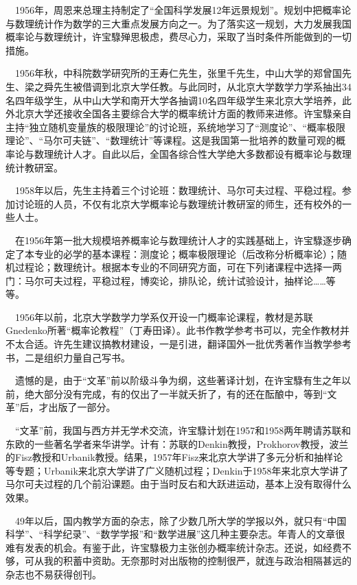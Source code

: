 $\quad$1956年，周恩来总理主持制定了“全国科学发展12年远景规划”。规划中把概率论与数理统计作为数学的三大重点发展方向之一。为了落实这一规划，大力发展我国概率论与数理统计，许宝騄殚思极虑，费尽心力，采取了当时条件所能做到的一切措施。

$\quad$1956年秋，中科院数学研究所的王寿仁先生，张里千先生，中山大学的郑曾国先生、梁之舜先生被借调到北京大学任教。与此同时，从北京大学数学力学系抽出34名四年级学生，从中山大学和南开大学各抽调10名四年级学生来北京大学培养，此外北京大学还接收全国各主要综合大学的概率统计方面的教师来进修。许宝騄亲自主持“独立随机变量族的极限理论”的讨论班，系统地学习了“测度论”、“概率极限理论”、“马尔可夫链”、“数理统计”等课程。这是我国第一批培养的数量可观的概率论与数理统计人才。自此以后，全国各综合性大学绝大多数都设有概率论与数理统计教研室。

$\quad$1958年以后，先生主持着三个讨论班：数理统计、马尔可夫过程、平稳过程。参加讨论班的人员，不仅有北京大学概率论与数理统计教研室的师生，还有校外的一些人士。

$\quad$在1956年第一批大规模培养概率论与数理统计人才的实践基础上，许宝騄逐步确定了本专业的必学的基本课程：测度论；概率极限理论（后改称分析概率论）；随机过程论；数理统计。根据本专业的不同研究方面，可在下列诸课程中选择一两门：马尔可夫过程，平稳过程，博奕论，排队论，统计试验设计，抽样论……等等。

$\quad$1956年以前，北京大学数学力学系仅开设一门概率论课程，教材是苏联Gnedenko所著“概率论教程”（丁寿田译）。此书作教学参考书可以，完全作教材并不太合适。许先生建议搞教材建设，一是引进，翻译国外一批优秀著作当教学参考书，二是组织力量自己写书。

$\quad$遗憾的是，由于“文革”前以阶级斗争为纲，这些著译计划，在许宝騄有生之年以前，绝大部分没有完成，有的仅出了一半就夭折了，有的还在酝酿中，等到“文革”后，才出版了一部分。

$\quad$“文革”前，我国与西方并无学术交流，许宝騄计划在1957和1958两年聘请苏联和东欧的一些著名学者来华讲学。计有：苏联的Denkin教授，Prokhorov教授，波兰的Fisz教授和Urbanik教授。结果，1957年Fisz来北京大学讲了多元分析和抽样论等专题；Urbanik来北京大学讲了广义随机过程；Denkin于1958年来北京大学讲了马尔可夫过程的几个前沿课题。由于当时反右和大跃进运动，基本上没有取得什么效果。

$\quad$49年以后，国内教学方面的杂志，除了少数几所大学的学报以外，就只有“中国科学”、“科学纪录”、“数学学报”和“数学进展”这几种主要杂志。年青人的文章很难有发表的机会。有鉴于此，许宝騄极力主张创办概率统计杂志。还说，如经费不够，可从我的积蓄中资助。无奈那时对出版物的控制很严，就连与政治相隔甚远的杂志也不易获得创刊。

